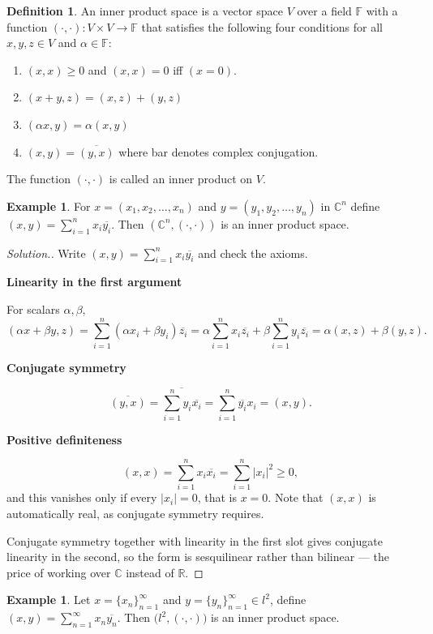 \documentclass[11pt,a4paper]{article}
\theoremstyle{definition}
\newtheorem{defn}[thm]{Definition}
\newtheorem{exa}[thm]{Example}
\newenvironment{solution}
  {\renewcommand{\qedsymbol}{}\begin{proof}[\textit{Solution}.]}
  {\end{proof}}
\newcommand{\subhead}[1]{%
  \par\medskip\noindent\textbf{#1}\par\nobreak\smallskip}
\begin{document}
\begin{defn}
An inner product space is a vector space $V$ over a field $\mathbb{F}$ with a function $(\cdot,\cdot):V\times V\rightarrow \mathbb{F}$ that satisfies the following four conditions for all $x,y,z\in V$ and $\alpha \in \mathbb{F}$:
\begin{enumerate}
\item $(x,x)\geq 0$ and $(x,x)=0$ iff $(x=0)$.
\item $(x+y,z)=(x,z)+(y,z)$
\item $(\alpha x,y)=\alpha (x,y)$
\item $(x,y)=\overline{(y,x)}$ where bar denotes complex conjugation.
\end{enumerate}
The function $(\cdot,\cdot)$ is called an inner product on $V$.

\end{defn}


\begin{exa}
For $x=(x_1,x_2,\dots,x_n)$ and $y=(y_1,y_2,\dots,y_n)$ in $\mathbb{C}^n$ define \hspace{0.2cm}$\displaystyle{(x,y)=\sum^{n}_{i=1}x_i\overline{y_i}}.$ Then $(\mathbb{C}^n,(\cdot,\cdot))$ is an inner product space.

\end{exa}

\begin{solution}
Write $(x,y)=\sum_{i=1}^{n}x_i\overline{y_i}$ and check the axioms.

\subhead{Linearity in the first argument}
For scalars $\alpha,\beta$,
$$(\alpha x+\beta y,z)=\sum_{i=1}^{n}(\alpha x_i+\beta y_i)\overline{z_i}
=\alpha\sum_{i=1}^{n}x_i\overline{z_i}+\beta\sum_{i=1}^{n}y_i\overline{z_i}
=\alpha(x,z)+\beta(y,z).$$

\subhead{Conjugate symmetry}
$$\overline{(y,x)}=\overline{\sum_{i=1}^{n}y_i\overline{x_i}}
=\sum_{i=1}^{n}\overline{y_i}x_i=(x,y).$$

\subhead{Positive definiteness}
$$(x,x)=\sum_{i=1}^{n}x_i\overline{x_i}=\sum_{i=1}^{n}|x_i|^2\geq 0 ,$$
and this vanishes only if every $|x_i|=0$, that is $x=0$. Note that $(x,x)$ is
automatically real, as conjugate symmetry requires.

Conjugate symmetry together with linearity in the first slot gives conjugate
linearity in the second, so the form is sesquilinear rather than bilinear ---
the price of working over $\mathbb{C}$ instead of $\mathbb{R}$.
\end{solution}


\begin{exa}
Let $x=\{x_n\}_{n=1}^{\infty}$ and $y=\{y_n\}^{\infty}_{n=1}\in l^2$, define \hspace{0.2cm}$\displaystyle{(x,y)=\sum^{\infty}_{n=1}x_n\overline{y_n}}.$ Then $\big(l^2,(\cdot,\cdot)\big)$ is an inner product space.

\end{exa}
\end{document}
